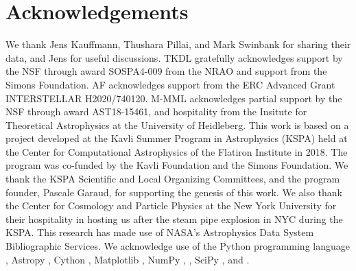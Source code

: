 \IfFileExists{emulateapjlegacy.cls}{\documentclass[iop]{emulateapjlegacy}}{\documentclass[iop]{emulateapj}}
\begin{document}

\section*{Acknowledgements}
We thank Jens Kauffmann, Thushara Pillai, and Mark Swinbank for sharing their data, and Jens for useful discussions.
%
TKDL gratefully acknowledges support by the NSF through award SOSPA4-009 from the NRAO and support from the Simons Foundation.
%
AF acknowledges support from the ERC Advanced Grant INTERSTELLAR
H2020/740120.
M-MML acknowledges partial support by the NSF through award
AST18-15461, and hospitality from the Insitute for Theoretical
Astrophysics at the University of Heidleberg.
%
This work is based on a project developed at the Kavli Summer Program in Astrophysics (KSPA) held at the Center for Computational Astrophysics of the Flatiron Institute in 2018. The program was co-funded by the Kavli Foundation and the Simons Foundation.
%
We thank the KSPA Scientific and Local Organizing Committees, and the program founder, Pascale Garaud, for supporting the genesis of this work.
%
We also thank the Center for Cosmology and Particle Physics at the New York University for their hospitality in hosting us after the steam pipe explosion in NYC during the KSPA.
%
This research has made use of NASA's Astrophysics Data System Bibliographic Services.
%
We acknowledge use of the Python programming language \citep{VanRossum1991}, Astropy \citep{astropy}, Cython \citep{behnel2010cython}, Matplotlib \citep{Hunter2007}, NumPy \citep{VanDerWalt2011},  \citep{Labadens2012}, SciPy \citep{scipyref}, and  \citep{Smith09a,Turk11a}.
%



\end{document}
